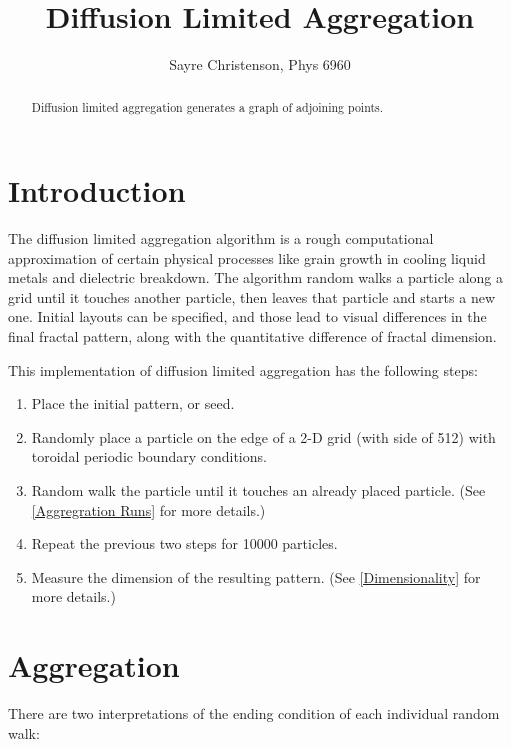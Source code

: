 \documentclass[12pt]{article}
\begin{document}
\title{Diffusion Limited Aggregation}
\date{}
\author{Sayre Christenson, Phys 6960}

\maketitle


\begin{abstract}

Diffusion limited aggregation generates a graph of adjoining points.


\end{abstract}

\section*{Introduction}

The diffusion limited aggregation algorithm is a rough computational approximation of certain physical processes like grain growth in cooling liquid metals and dielectric breakdown.
The algorithm random walks a particle along a grid until it touches another particle, then leaves that particle and starts a new one.
Initial layouts can be specified, and those lead to visual differences in the final fractal pattern, along with the quantitative difference of fractal dimension.

This implementation of diffusion limited aggregation has the following steps:

\begin{enumerate}
\item{Place the initial pattern, or seed.}
\item{Randomly place a particle on the edge of a 2-D grid (with side of 512) with toroidal periodic boundary conditions.}
\item{Random walk the particle until it touches an already placed particle.  (See \ref{Aggregration Runs} for more details.)}
\item{Repeat the previous two steps for 10000 particles.}
\item{Measure the dimension of the resulting pattern.  (See \ref{Dimensionality} for more details.)}
\end{enumerate}


\section*{Aggregation}

There are two interpretations of the ending condition of each individual random walk:
\end{document}
